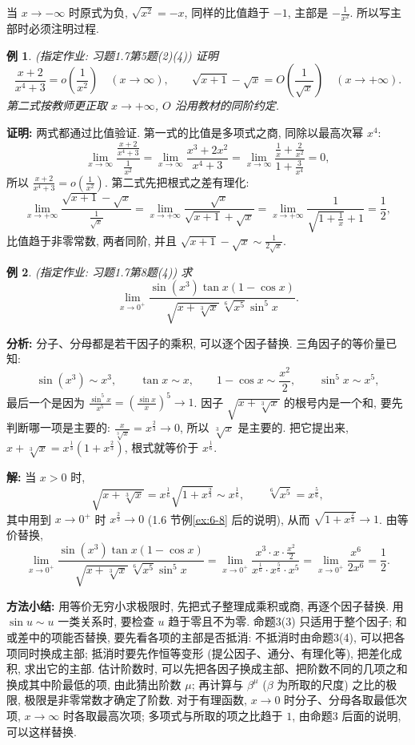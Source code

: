 \documentclass[UTF8,openany]{ctexbook}
\theoremstyle{chinesetextbook}
\newtheorem{example}{例}[section]
\newenvironment{cnproof}{\par\indent\textbf{证明:} \ignorespaces}{\par}
\newenvironment{cnsolution}{\par\indent\textbf{解:} \ignorespaces}{\par}
\begin{document}
当 $x\to-\infty$ 时原式为负, $\sqrt{x^2}=-x$, 同样的比值趋于 $-1$, 主部是 $\displaystyle-\frac1{x^2}$. 所以写主部时必须注明过程.
\begin{example}
\textnormal{(指定作业: 习题1.7第5题(2)(4))} 证明
\[
\frac{x+2}{x^4+3}=o\!\left(\frac1{x^2}\right)\quad(x\to\infty),\qquad\sqrt{x+1}-\sqrt x=O\!\left(\frac1{\sqrt x}\right)\quad(x\to+\infty).
\]
第二式按教师更正取 $x\to+\infty$, $O$ 沿用教材的同阶约定.
\end{example}
\begin{cnproof}
两式都通过比值验证. 第一式的比值是多项式之商, 同除以最高次幂 $x^4$:
\[
\lim_{x\to\infty}\frac{\frac{x+2}{x^4+3}}{\frac1{x^2}}=\lim_{x\to\infty}\frac{x^3+2x^2}{x^4+3}=\lim_{x\to\infty}\frac{\frac1x+\frac2{x^2}}{1+\frac3{x^4}}=0,
\]
所以 $\displaystyle\frac{x+2}{x^4+3}=o\!\left(\frac1{x^2}\right)$. 第二式先把根式之差有理化:
\[
\lim_{x\to+\infty}\frac{\sqrt{x+1}-\sqrt x}{\frac1{\sqrt x}}=\lim_{x\to+\infty}\frac{\sqrt x}{\sqrt{x+1}+\sqrt x}=\lim_{x\to+\infty}\frac1{\sqrt{1+\frac1x}+1}=\frac12,
\]
比值趋于非零常数, 两者同阶, 并且 $\displaystyle\sqrt{x+1}-\sqrt x\sim\frac1{2\sqrt x}$.
\end{cnproof}
\begin{example}
\textnormal{(指定作业: 习题1.7第8题(4))} 求
\[
\lim_{x\to0^+}\frac{\sin(x^3)\tan x(1-\cos x)}{\sqrt{x+\sqrt[3]x}\,\sqrt[6]{x^5}\sin^5x}.
\]
\end{example}
\par\indent\textbf{分析:} 分子、分母都是若干因子的乘积, 可以逐个因子替换. 三角因子的等价量已知:
\[
\sin(x^3)\sim x^3,\qquad\tan x\sim x,\qquad1-\cos x\sim\frac{x^2}2,\qquad\sin^5x\sim x^5,
\]
最后一个是因为 $\displaystyle\frac{\sin^5x}{x^5}=\left(\frac{\sin x}x\right)^5\to1$. 因子 $\sqrt{x+\sqrt[3]x}$ 的根号内是一个和, 要先判断哪一项是主要的: $\displaystyle\frac x{\sqrt[3]x}=x^{\frac23}\to0$, 所以 $\sqrt[3]x$ 是主要的. 把它提出来, $x+\sqrt[3]x=x^{\frac13}\left(1+x^{\frac23}\right)$, 根式就等价于 $x^{\frac16}$.
\begin{cnsolution}
当 $x>0$ 时,
\[
\sqrt{x+\sqrt[3]x}=x^{\frac16}\sqrt{1+x^{\frac23}}\sim x^{\frac16},\qquad\sqrt[6]{x^5}=x^{\frac56},
\]
其中用到 $x\to0^+$ 时 $x^{\frac23}\to0$ (1.6 节例\ref{ex:6-8} 后的说明), 从而 $\sqrt{1+x^{\frac23}}\to1$. 由等价替换,
\[
\lim_{x\to0^+}\frac{\sin(x^3)\tan x(1-\cos x)}{\sqrt{x+\sqrt[3]x}\,\sqrt[6]{x^5}\sin^5x}=\lim_{x\to0^+}\frac{x^3\cdot x\cdot\frac{x^2}2}{x^{\frac16}\cdot x^{\frac56}\cdot x^5}=\lim_{x\to0^+}\frac{x^6}{2x^6}=\frac12.
\]
\end{cnsolution}
\par\indent\textbf{方法小结:} 用等价无穷小求极限时, 先把式子整理成乘积或商, 再逐个因子替换. 用 $\sin u\sim u$ 一类关系时, 要检查 $u$ 趋于零且不为零. 命题3(3) 只适用于整个因子; 和或差中的项能否替换, 要先看各项的主部是否抵消: 不抵消时由命题3(4), 可以把各项同时换成主部; 抵消时要先作恒等变形 (提公因子、通分、有理化等), 把差化成积, 求出它的主部. 估计阶数时, 可以先把各因子换成主部、把阶数不同的几项之和换成其中阶最低的项, 由此猜出阶数 $\mu$; 再计算与 $\beta^\mu$ ($\beta$ 为所取的尺度) 之比的极限, 极限是非零常数才确定了阶数. 对于有理函数, $x\to0$ 时分子、分母各取最低次项, $x\to\infty$ 时各取最高次项; 多项式与所取的项之比趋于 $1$, 由命题3 后面的说明, 可以这样替换.
\end{document}
